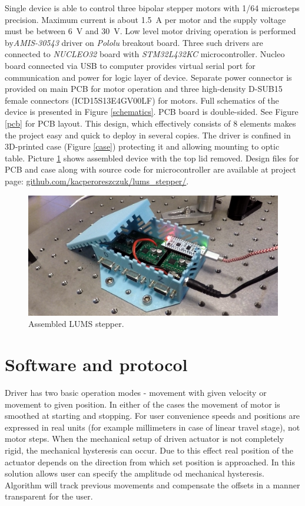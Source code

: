 \documentclass[10pt,article]{article}
\begin{document}
Single device is able to control three bipolar stepper motors with 1/64 microsteps precision. Maximum current is about \SI{1.5}{A} per motor and the supply voltage must be between \SI{6}{V} and \SI{30}{V}.
Low level motor driving operation  is performed by\textit{AMIS-30543} driver on \textit{Pololu} breakout board. Three such drivers are connected to \textit{NUCLEO32}  board with \textit{STM32L432KC} microcontroller. Nucleo board connected via USB to computer provides virtual serial port for communication and power for logic layer of device. Separate power connector is provided on main PCB for motor operation and three high-density D-SUB15 female connectors (ICD15S13E4GV00LF) for motors. Full schematics of the device is presented in Figure \ref{schematics}. PCB board is double-sided. See Figure \ref{pcb} for PCB layout. This design, which effectively consists of 8 elements makes the project easy and quick to deploy in several copies. The driver is confined in 3D-printed case (Figure \ref{case}) protecting it and allowing mounting to optic table. Picture \ref{photo} shows assembled device with the top lid removed. Design files for PCB and case along with source code for microcontroller are available at project page: \url{github.com/kacperoreszczuk/lums_stepper/}. 

\begin{figure}[h]
 \centering
 \includegraphics[width = 12.5cm]{photo.png}
\caption {Assembled LUMS stepper.} \label{photo}
\end{figure}

\section{Software and protocol}

Driver has two basic operation modes - movement with given velocity or movement to given position. In either of the cases the movement of motor is smoothed at starting and stopping. For user convenience speeds and positions are expressed in real units (for example millimeters in case of linear travel stage), not motor steps. When the mechanical setup of driven actuator is not completely rigid, the mechanical hysteresis can occur. Due to this effect real position of the  actuator depends on the direction from which set position is approached. In this solution allows user can specify the amplitude od mechanical hysteresis. Algorithm will track previous movements and compensate the offsets in a manner transparent for the user. 
\end{document}
